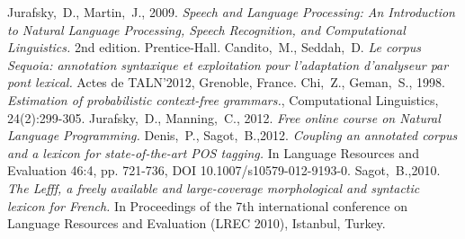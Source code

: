 \documentclass[12pt]{article}
\begin{document}
\begin{thebibliography}{9}
    Jurafsky,~D., Martin,~J., 2009. \emph{Speech and Language Processing: An Introduction to Natural Language Processing, Speech Recognition, and Computational Linguistics.} 2nd edition. Prentice-Hall.
    Candito,~M., Seddah,~D.
    \emph{Le corpus Sequoia: annotation syntaxique et exploitation pour
    l'adaptation d'analyseur par pont lexical.} Actes de TALN'2012, Grenoble,
    France.
    Chi,~Z., Geman,~S., 1998.
    \emph{Estimation of probabilistic context-free grammars.}, Computational Linguistics, 24(2):299-305.
    Jurafsky,~D., Manning,~C., 2012. \emph{Free online course on Natural
    Language Programming.}
    Denis,~P., Sagot,~B.,2012.
    \emph{Coupling an annotated corpus and a lexicon for state-of-the-art POS
    tagging.} In Language Resources and Evaluation 46:4, pp. 721-736,
    DOI 10.1007/s10579-012-9193-0.
    Sagot,~B.,2010.
    \emph{The Lefff, a freely available and large-coverage morphological and
    syntactic lexicon for French.} In Proceedings of the 7th international
    conference on Language Resources and Evaluation (LREC 2010), Istanbul,
    Turkey.

\end{thebibliography}
\end{document}
